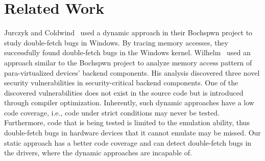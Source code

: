 \documentclass[10pt]{llncs}
\begin{document}



\section{Related Work}
\label{related}



Jurczyk and Coldwind~\cite{bochspwn,jurczyk2013identifying} used a dynamic approach in their Bochspwn project to study double-fetch bugs in Windows. By tracing memory accesses, they successfully found double-fetch bugs in the Windows kernel. Wilhelm~\cite{wilhelm15tracing} used an approach similar to the
Bochspwn project to analyze memory access pattern of para-virtualized
devices' backend components. His analysis discovered three novel security
vulnerabilities in security-critical backend components. One of the
discovered vulnerabilities does not exist in the source code but is
introduced through compiler optimization.
Inherently, such dynamic approaches have a low code coverage, i.e., code under strict conditions may never be tested. Furthermore, code that is being tested is limited to the emulation ability, thus double-fetch bugs in hardware devices that it cannot emulate may be missed. Our static approach has a better code coverage and can detect double-fetch bugs in the drivers, where the dynamic approaches are incapable of.
\end{document}
